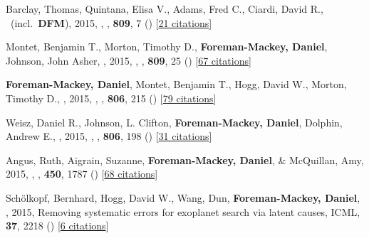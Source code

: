 \item[{\color{numcolor}\scriptsize13}] Barclay, Thomas, Quintana, Elisa V., Adams, Fred C., Ciardi, David R., \etal\ (incl.\ \textbf{DFM}), 2015, , \apj, \textbf{809}, 7 () [\href{http://adsabs.harvard.edu/abs/2015ApJ...809....7B}{21 citations}]

\item[{\color{numcolor}\scriptsize12}] Montet, Benjamin T., Morton, Timothy D., \textbf{Foreman-Mackey, Daniel}, Johnson, John Asher, \etal, 2015, , \apj, \textbf{809}, 25 () [\href{http://adsabs.harvard.edu/abs/2015ApJ...809...25M}{67 citations}]

\item[{\color{numcolor}\scriptsize11}] \textbf{Foreman-Mackey, Daniel}, Montet, Benjamin T., Hogg, David W., Morton, Timothy D., \etal, 2015, , \apj, \textbf{806}, 215 () [\href{http://adsabs.harvard.edu/abs/2015ApJ...806..215F}{79 citations}]

\item[{\color{numcolor}\scriptsize10}] Weisz, Daniel R., Johnson, L. Clifton, \textbf{Foreman-Mackey, Daniel}, Dolphin, Andrew E., \etal, 2015, , \apj, \textbf{806}, 198 () [\href{http://adsabs.harvard.edu/abs/2015ApJ...806..198W}{31 citations}]

\item[{\color{numcolor}\scriptsize9}] Angus, Ruth, Aigrain, Suzanne, \textbf{Foreman-Mackey, Daniel}, \& McQuillan, Amy, 2015, , \mnras, \textbf{450}, 1787 () [\href{http://adsabs.harvard.edu/abs/2015MNRAS.450.1787A}{68 citations}]

\item[{\color{numcolor}\scriptsize8}] Sch{\"o}lkopf, Bernhard, Hogg, David W., Wang, Dun, \textbf{Foreman-Mackey, Daniel}, \etal, 2015, Removing systematic errors for exoplanet search via latent causes, ICML, \textbf{37}, 2218 () [\href{https://scholar.google.com/scholar?cites=11768165421845046384}{6 citations}]

